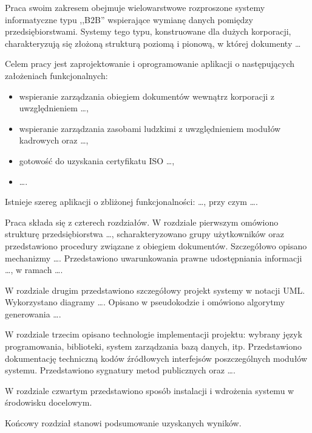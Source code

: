 {\color{dgray}
Praca swoim zakresem obejmuje wielowarstwowe rozproszone systemy informatyczne typu ,,B2B'' wspierające wymianę danych pomiędzy przedsiębiorstwami. Systemy tego typu, konstruowane dla dużych korporacji, charakteryzują się złożoną strukturą poziomą i pionową, w której dokumenty \ldots

Celem pracy jest zaprojektowanie i oprogramowanie aplikacji o następujących założeniach funkcjonalnych:
\begin{itemize}
    \item wspieranie zarządzania obiegiem dokumentów wewnątrz korporacji z uwzględnieniem \ldots,
	\item wspieranie zarządzania zasobami ludzkimi z uwzględnieniem modułów kadrowych oraz \ldots,
	\item gotowość do uzyskania certyfikatu ISO \ldots,
	\item \ldots.
\end{itemize}

Istnieje szereg aplikacji o zbliżonej funkcjonalności: \ldots, przy czym \ldots.

Praca składa się z czterech rozdziałów.
W rozdziale pierwszym omówiono strukturę przedsiębiorstwa \ldots, scharakteryzowano grupy użytkowników oraz przedstawiono procedury związane z obiegiem dokumentów. Szczegółowo opisano mechanizmy \ldots. Przedstawiono uwarunkowania prawne udostępniania informacji \ldots, w ramach \ldots.

W rozdziale drugim przedstawiono szczegółowy projekt systemy w notacji UML. Wykorzystano diagramy \ldots.
Opisano w pseudokodzie i omówiono algorytmy generowania \ldots.

W rozdziale trzecim opisano technologie implementacji projektu: wybrany język programowania, biblioteki, system zarządzania bazą danych, itp.  Przedstawiono dokumentację techniczną kodów źródłowych interfejsów poszczególnych modułów systemu. Przedstawiono sygnatury metod publicznych oraz \ldots.

W rozdziale czwartym przedstawiono sposób instalacji i wdrożenia systemu w środowisku docelowym.

Końcowy rozdział stanowi podsumowanie uzyskanych wyników.
}
\fi


